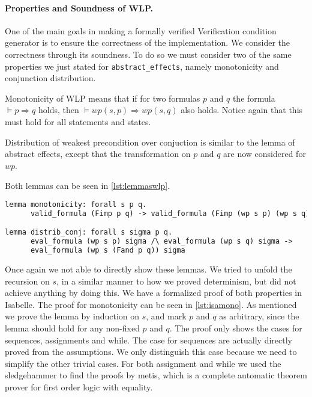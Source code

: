 \paragraph{Properties and Soundness of WLP.}
One of the main goals in making a formally verified Verification condition generator is to ensure the correctness of the implementation.
We consider the correctness through its soundness.
To do so we must consider two of the same properties we just stated for \texttt{abstract\_effects}, namely monotonicity and conjunction distribution.

Monotonicity of WLP means that if for two formulas $p$ and $q$ the formula $\vDash p \Rightarrow q$ holds, then $\vDash wp(s, p) \Rightarrow wp(s,q)$ also holds.
Notice again that this must hold for all statements and states.

Distribution of weakest precondition over conjuction is similar to the lemma of abstract effects, except that the transformation on $p$ and $q$ are now considered for $wp$.

Both lemmas can be seen in \autoref{lst:lemmaswlp}.

\begin{lstlisting}[caption={Lemmas for stating monotonicity and distribution over conjunction for wlp},label={lst:lemmaswlp},language=sml]
lemma monotonicity: forall s p q.
      valid_formula (Fimp p q) -> valid_formula (Fimp (wp s p) (wp s q))

lemma distrib_conj: forall s sigma p q.
      eval_formula (wp s p) sigma /\ eval_formula (wp s q) sigma ->
      eval_formula (wp s (Fand p q)) sigma
\end{lstlisting}

Once again we not able to directly show these lemmas.
We tried to unfold the recursion on $s$, in a similar manner to how we proved determinism, but
 did not achieve anything by doing this.
We have a formalized proof of both properties in Isabelle.
The proof for monotonicity can be seen in \autoref{lst:isamono}.
As mentioned we prove the lemma by induction on $s$,
and mark $p$ and $q$ as arbitrary, since the lemma should hold for any non-fixed $p$ and $q$.
The proof only shows the cases for sequences, assignments and while.
The case for sequences are actually directly proved from the assumptions.
We only distinguish this case because we need to simplify the other trivial cases.
For both assignment and while we used the sledgehammer to find the proofs by metis,
which is a complete automatic theorem prover for first order logic with equality\cite{sledgehammer}.

